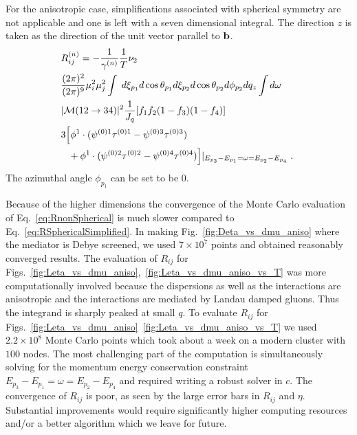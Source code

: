 \documentclass[10pt, aps, prd, superscriptaddress, nofootinbib, 
               amsmath, amssymb, twocolumn,
               preprintnumbers, showpacs,
               raggedbottom,
               floatfix]{revtex4-1}
\newcommand{\calM}{{\cal{M}}}
\newcommand{\bfb}{{\bf{b}}}
\begin{document}
For the anisotropic case, simplifications associated with spherical symmetry
are not applicable and one is left with a seven dimensional integral. The
direction $z$ is taken as the direction of the unit vector parallel to $\bfb$.
\begin{equation}
\begin{split}
&R_{ij}^{(n)}=-\frac{1}{\gamma^{(n)}}\frac{1}{T} \nu_2\\ 
&\frac{(2\pi)^2}{(2\pi)^9}\mu_i^2\mu_j^2 \int\;
d\xi_{p_1} d\cos\theta_{p_1} d\xi_{p_2} d\cos\theta_{p_2} d\phi_{p_2} dq_z
\int d\omega\\
&
|\calM(12\rightarrow34)|^2
\frac{1}{J_q}[f_1f_2(1-f_3)(1-f_4)]\\
&
3\Bigl[\phi^{1}\cdot(\psi^{(0)1}\tau^{(0)1}-\psi^{(0)3}\tau^{(0)3}) \\
 &
 \phantom{+}+
 \phi^{1}\cdot(\psi^{(0)2}\tau^{(0)2}-\psi^{(0)4}\tau^{(0)4})
 \Bigr]|_{E_{p_3}-E_{p_1}=\omega=E_{p_2}-E_{p_4}}
\;.~\label{eq:RnonSpherical}
\end{split}
\end{equation}
The azimuthal angle $\phi_{p_1}$ can be set to be $0$.

Because of the higher dimensions the convergence of the Monte Carlo evaluation
of Eq.~\ref{eq:RnonSpherical} is much slower compared to
Eq.~\ref{eq:RSphericalSimplified}. In making Fig.~\ref{fig:Deta_vs_dmu_aniso} where the
mediator is Debye screened, we used $7\times 10^7$ points and obtained
reasonably converged results. The evaluation of $R_{ij}$ for
Figs.~\ref{fig:Leta_vs_dmu_aniso},~\ref{fig:Leta_vs_dmu_aniso_vs_T} was more
computationally involved because the dispersions as well as the
interactions are anisotropic and the interactions are mediated by Landau damped
gluons. Thus the integrand is sharply peaked at small $q$. To evaluate $R_{ij}$
for Figs.~\ref{fig:Leta_vs_dmu_aniso}~\ref{fig:Leta_vs_dmu_aniso_vs_T} we used
$2.2\times10^8$ Monte Carlo points which took about a week on a modern cluster
with $100$ nodes. The most challenging part of the computation is
simultaneously solving for the momentum energy conservation constraint
$E_{p_3}-E_{p_1}=\omega=E_{p_2}-E_{p_4}$ and required writing a robust solver
in $c$.
The convergence of $R_{ij}$ is poor, as seen by the large error bars in
$R_{ij}$ and $\eta$. Substantial improvements would require significantly higher
computing resources and/or a better algorithm which we leave for future.



\end{document}
